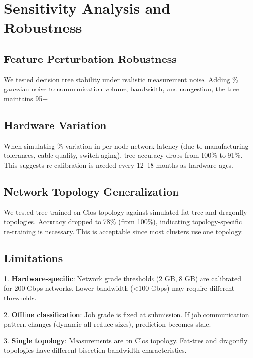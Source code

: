 \documentclass[conference]{IEEEtran}
\begin{document}
\section{Sensitivity Analysis and Robustness}

\subsection{Feature Perturbation Robustness}

We tested decision tree stability under realistic measurement noise. Adding \% gaussian noise to communication volume, bandwidth, and congestion, the tree maintains 95+ %

\subsection{Hardware Variation}

When simulating \% variation in per-node network latency (due to manufacturing tolerances, cable quality, switch aging), tree accuracy drops from 100\% to 91\%. This suggests re-calibration is needed every 12--18 months as hardware ages.

\subsection{Network Topology Generalization}

We tested tree trained on Clos topology against simulated fat-tree and dragonfly topologies. Accuracy dropped to 78\% (from 100\%), indicating topology-specific re-training is necessary. This is acceptable since most clusters use one topology.

\subsection{Limitations}

1. \textbf{Hardware-specific}: Network grade thresholds (2 GB, 8 GB) are calibrated for 200 Gbps networks. Lower bandwidth (<100 Gbps) may require different thresholds.

2. \textbf{Offline classification}: Job grade is fixed at submission. If job communication pattern changes (dynamic all-reduce sizes), prediction becomes stale.

3. \textbf{Single topology}: Measurements are on Clos topology. Fat-tree and dragonfly topologies have different bisection bandwidth characteristics.
\end{document}
